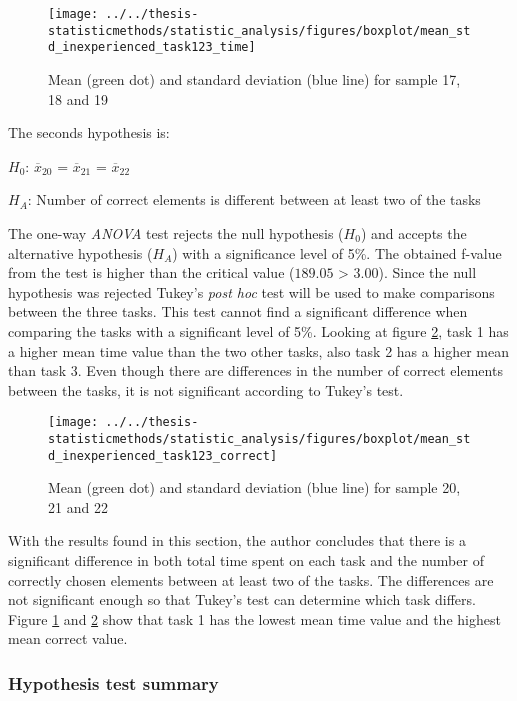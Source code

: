 \begin{figure}[H]
	\centering
	\texttt{[image: ../../thesis-statisticmethods/statistic\_analysis/figures/boxplot/mean\_std\_inexperienced\_task123\_time]}
	\caption{Mean (green dot) and standard deviation (blue line) for sample 17, 18 and 19}
	\label{fig:meanstdinexperiencedtask123time}
\end{figure}

The seconds hypothesis is:\\
\centerline{$H_{0}$: $\overline{x}_{20}$ = $\overline{x}_{21}$ = $\overline{x}_{22}$}
\centerline{$H_{A}$: Number of correct elements is different between at least two of the tasks}

The one-way \textit{ANOVA} test rejects the null hypothesis ($H_0$) and accepts the alternative hypothesis ($H_{A}$) with a significance level of 5\%. The obtained f-value from the test is higher than the critical value ($189.05$ > $3.00$). Since the null hypothesis was rejected Tukey's \textit{post hoc} test will be used to make comparisons between the three tasks. This test cannot find a significant difference when comparing the tasks with a significant level of 5\%. Looking at figure \ref{fig:meanstdinexperiencedtask123correct}, task 1 has a higher mean time value than the two other tasks, also task 2 has a higher mean than task 3. Even though there are differences in the number of correct elements between the tasks, it is not significant according to Tukey's test. 

\begin{figure}[H]
	\centering
	\texttt{[image: ../../thesis-statisticmethods/statistic\_analysis/figures/boxplot/mean\_std\_inexperienced\_task123\_correct]}
	\caption{Mean (green dot) and standard deviation (blue line) for sample 20, 21 and 22}
	\label{fig:meanstdinexperiencedtask123correct}
\end{figure}

With the results found in this section, the author concludes that there is a significant difference in both total time spent on each task and the number of correctly chosen elements between at least two of the tasks. The differences are not significant enough so that Tukey's test can determine which task differs. Figure \ref{fig:meanstdinexperiencedtask123time} and \ref{fig:meanstdinexperiencedtask123correct} show that task 1 has the lowest mean time value and the highest mean correct value. 

\subsubsection{Hypothesis test summary}


